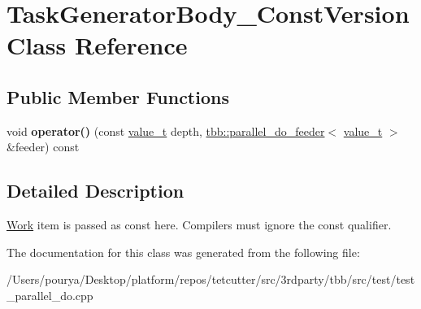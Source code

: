 \hypertarget{classTaskGeneratorBody__ConstVersion}{}\section{Task\+Generator\+Body\+\_\+\+Const\+Version Class Reference}
\label{classTaskGeneratorBody__ConstVersion}
\subsection*{Public Member Functions}
\begin{DoxyCompactItemize}
\item 
\hypertarget{classTaskGeneratorBody__ConstVersion_a3c38e1469ab7004684d4ee119805eef9}{}void {\bfseries operator()} (const \hyperlink{classvalue__t}{value\+\_\+t} depth, \hyperlink{classtbb_1_1parallel__do__feeder}{tbb\+::parallel\+\_\+do\+\_\+feeder}$<$ \hyperlink{classvalue__t}{value\+\_\+t} $>$ \&feeder) const \label{classTaskGeneratorBody__ConstVersion_a3c38e1469ab7004684d4ee119805eef9}

\end{DoxyCompactItemize}


\subsection{Detailed Description}
\hyperlink{structWork}{Work} item is passed as const here. Compilers must ignore the const qualifier. 

The documentation for this class was generated from the following file\+:\begin{DoxyCompactItemize}
\item 
/\+Users/pourya/\+Desktop/platform/repos/tetcutter/src/3rdparty/tbb/src/test/test\+\_\+parallel\+\_\+do.\+cpp\end{DoxyCompactItemize}
